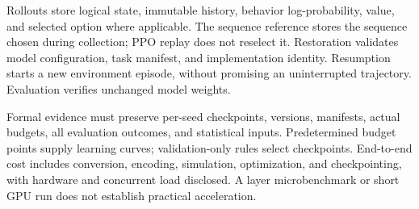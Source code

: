 \documentclass[conference]{IEEEtran}
\begin{document}
Rollouts store logical state, immutable history, behavior log-probability, value, and selected option where applicable. The sequence reference stores the sequence chosen during collection; PPO replay does not reselect it. Restoration validates model configuration, task manifest, and implementation identity. Resumption starts a new environment episode, without promising an uninterrupted trajectory. Evaluation verifies unchanged model weights.

Formal evidence must preserve per-seed checkpoints, versions, manifests, actual budgets, all evaluation outcomes, and statistical inputs. Predetermined budget points supply learning curves; validation-only rules select checkpoints. End-to-end cost includes conversion, encoding, simulation, optimization, and checkpointing, with hardware and concurrent load disclosed. A layer microbenchmark or short GPU run does not establish practical acceleration.



\end{document}
